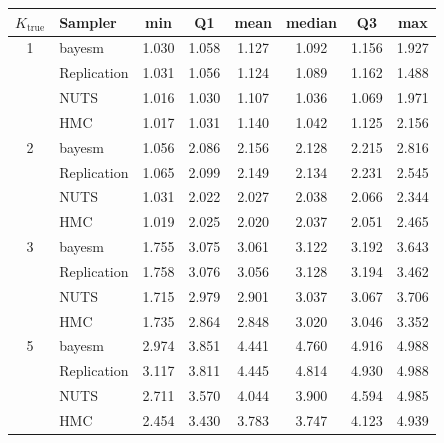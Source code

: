 \begin{tabular}{clcccccc}
\toprule
$K_{\text{true}}$ & Sampler & min & Q1 & mean & median & Q3 & max \\
\midrule
1 & bayesm & 1.030 & 1.058 & 1.127 & 1.092 & 1.156 & 1.927 \\
 & Replication & 1.031 & 1.056 & 1.124 & 1.089 & 1.162 & 1.488 \\
 & NUTS & 1.016 & 1.030 & 1.107 & 1.036 & 1.069 & 1.971 \\
 & HMC & 1.017 & 1.031 & 1.140 & 1.042 & 1.125 & 2.156 \\
2 & bayesm & 1.056 & 2.086 & 2.156 & 2.128 & 2.215 & 2.816 \\
 & Replication & 1.065 & 2.099 & 2.149 & 2.134 & 2.231 & 2.545 \\
 & NUTS & 1.031 & 2.022 & 2.027 & 2.038 & 2.066 & 2.344 \\
 & HMC & 1.019 & 2.025 & 2.020 & 2.037 & 2.051 & 2.465 \\
3 & bayesm & 1.755 & 3.075 & 3.061 & 3.122 & 3.192 & 3.643 \\
 & Replication & 1.758 & 3.076 & 3.056 & 3.128 & 3.194 & 3.462 \\
 & NUTS & 1.715 & 2.979 & 2.901 & 3.037 & 3.067 & 3.706 \\
 & HMC & 1.735 & 2.864 & 2.848 & 3.020 & 3.046 & 3.352 \\
5 & bayesm & 2.974 & 3.851 & 4.441 & 4.760 & 4.916 & 4.988 \\
 & Replication & 3.117 & 3.811 & 4.445 & 4.814 & 4.930 & 4.988 \\
 & NUTS & 2.711 & 3.570 & 4.044 & 3.900 & 4.594 & 4.985 \\
 & HMC & 2.454 & 3.430 & 3.783 & 3.747 & 4.123 & 4.939 \\
\bottomrule
\end{tabular}
